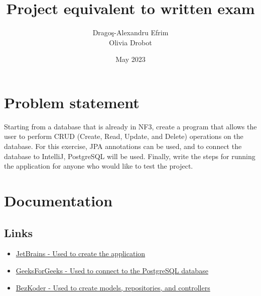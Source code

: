 \documentclass{article}
\title{Project equivalent to written exam}
\author{
  Drago\c{s}-Alexandru Efrim\\
  Olivia Drobot
}
\date{May 2023}
\begin{document}
\maketitle

\section{Problem statement}
Starting from a database that is already in NF3, create a program that allows the user to perform CRUD (Create, Read, Update, and Delete) operations on the database. For this exercise, JPA annotations can be used, and to connect the database to IntelliJ, PostgreSQL will be used. Finally, write the steps for running the application for anyone who would like to test the project.

\section{Documentation}
\subsection{Links}
\begin{itemize}
    \item \href{https://www.jetbrains.com/idea/guide/tutorials/your-first-spring-application/creating-spring-boot-application/}{JetBrains - Used to create the application}
    \item \href{https://www.geeksforgeeks.org/spring-boot-application-properties/}{GeeksForGeeks - Used to connect to the PostgreSQL database}
    \item \href{https://www.bezkoder.com/spring-boot-postgresql-example/}{BezKoder - Used to create models, repositories, and controllers}
\end{itemize}
\end{document}
